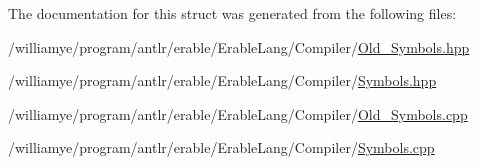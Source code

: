 The documentation for this struct was generated from the following files\+:\begin{DoxyCompactItemize}
\item 
/williamye/program/antlr/erable/\+Erable\+Lang/\+Compiler/\mbox{\hyperlink{_old___symbols_8hpp}{Old\+\_\+\+Symbols.\+hpp}}\item 
/williamye/program/antlr/erable/\+Erable\+Lang/\+Compiler/\mbox{\hyperlink{_symbols_8hpp}{Symbols.\+hpp}}\item 
/williamye/program/antlr/erable/\+Erable\+Lang/\+Compiler/\mbox{\hyperlink{_old___symbols_8cpp}{Old\+\_\+\+Symbols.\+cpp}}\item 
/williamye/program/antlr/erable/\+Erable\+Lang/\+Compiler/\mbox{\hyperlink{_symbols_8cpp}{Symbols.\+cpp}}\end{DoxyCompactItemize}
